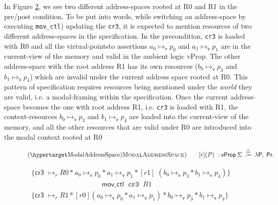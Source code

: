 In Figure \ref{fig:addrswitch}, we see two different address-spaces rooted at R0 and R1 in the pre/post condition. To be put into words, while switching an address-space by executing \lstinline|mov_ctl|) updating the  \lstinline|cr3|, it is expected to mention resources of two different address-spaces in the specification. In the precondition,  \lstinline|cr3| is loaded with R0 and all the virtual-pointsto assertions $a_0 \mapsto_{\textsf{v}}p_0$ and $a_1 \mapsto_{\textsf{v}}p_1$ are in the current-view of the memory and valid in the ambient logic \textsf{vProp}. The other address-space with the root address R1 has its own resources ($b_0 \mapsto_{\textsf{v}}p_3$ and $b_1 \mapsto_{\textsf{v}}p_4$) which are invalid under the current address space rooted at R0. This pattern of specification requires resources being mentioned under the \textit{world} they are valid, i.e. a modal-framing within the specification. Once the current address-space becomes the one with root address R1, i.e.  \lstinline|cr3| is loaded with R1, the context-resources $b_0 \mapsto_{\textsf{v}}p_3$ and $b_1 \mapsto_{\textsf{v}}p_4$ are loaded into the current-view of the memory, and all the other resources that are valid under R0 are introduced into the modal context rooted at R0
\begin{figure}

\[
  \begin{array}{l}
    \hbox{(\TirNameStyle{ModalAddressSpace)}} \qquad
         [r](P) \;: \mathsf{vProp} \; \Sigma \; \stackrel{\triangle}{:=} \; \lambda \mathsf{P},\; \mathsf{P r}. 
  \end{array}
  \]
  \label{fig:modaldef}
  \end{figure}
  
\begin{figure}
\[
\begin{array}{l}
  \{ \textsf{cr3 } \mapsto_{r} R0 \ast a_0 \mapsto_{\textsf{v}}p_0  \ast a_1 \mapsto_{\textsf{v}}p_1  \ast [r1]\;( b_0 \mapsto_{\textsf{v}}p_3  \ast b_1 \mapsto_{\textsf{v}}p_4 )\}\\
  \qquad \qquad \qquad \qquad \qquad \mathsf{mov\_ctl} \;\; \texttt{cr3} \; \; R1\\

  \{ \textsf{cr3 } \mapsto_{r} R1 \ast [r0](a_0 \mapsto_{\textsf{v}}p_0  \ast a_1 \mapsto_{\textsf{v}}p_1)  \ast  b_0 \mapsto_{\textsf{v}}p_3  \ast b_1 \mapsto_{\textsf{v}}p_4 \}
  \end{array}
\]
  \label{fig:addrswitch}
  \end{figure}

